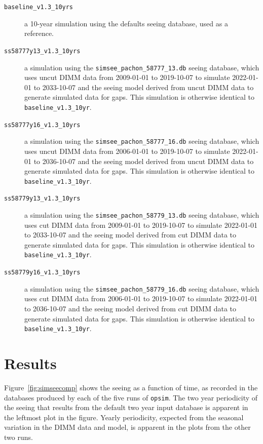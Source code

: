 \documentclass[DM,authoryear,toc]{lsstdoc}
\begin{document}
\begin{description}
   \item[{\tt baseline\_v1.3\_10yrs}] a 10-year simulation using the defaults
     seeing database, used as a reference.
  \item[{\tt ss58777y13\_v1.3\_10yrs}] a simulation using the
    {\tt simsee\_pachon\_58777\_13.db} seeing database, which uses
    uncut DIMM data from 2009-01-01 to 2019-10-07 to simulate
    2022-01-01 to 2033-10-07 and the seeing model derived from uncut
    DIMM data to generate simulated data for gaps. This simulation is otherwise identical
    to {\tt baseline\_v1.3\_10yr}.
  \item[{\tt ss58777y16\_v1.3\_10yrs}] a simulation using the
    {\tt simsee\_pachon\_58777\_16.db} seeing database, which uses
    uncut DIMM data from 2006-01-01 to 2019-10-07 to simulate
    2022-01-01 to 2036-10-07 and the seeing model derived from uncut
    DIMM data to generate simulated data for gaps. This simulation is otherwise identical
    to {\tt baseline\_v1.3\_10yr}.
  \item[{\tt ss58779y13\_v1.3\_10yrs}] a simulation using the
    {\tt simsee\_pachon\_58779\_13.db} seeing database, which uses
    cut DIMM data from 2009-01-01 to 2019-10-07 to simulate 2022-01-01
    to 2033-10-07 and the seeing model derived from cut DIMM data to
    generate simulated data for gaps. This simulation is otherwise
    identical to {\tt baseline\_v1.3\_10yr}.
  \item[{\tt ss58779y16\_v1.3\_10yrs}] a simulation using the
    {\tt simsee\_pachon\_58779\_16.db} seeing database, which uses
    cut DIMM data from 2006-01-01 to 2019-10-07 to simulate 2022-01-01
    to 2036-10-07 and the seeing model derived from cut DIMM data to
    generate simulated data for gaps. This simulation is otherwise
    identical to {\tt baseline\_v1.3\_10yr}.
\end{description}


\section{Results}
\label{sec:results}

Figure~\ref{fig:simseecomp} shows the seeing as a function of time, as
recorded in the databases produced by each of the five runs of
\texttt{opsim}. The two year periodicity of the seeing that results
from the default two year input database is apparent in the leftmost
plot in the figure. Yearly periodicity, expected from the seasonal
variation in the DIMM data and model, is apparent in the plots from
the other two runs. 
\end{document}
